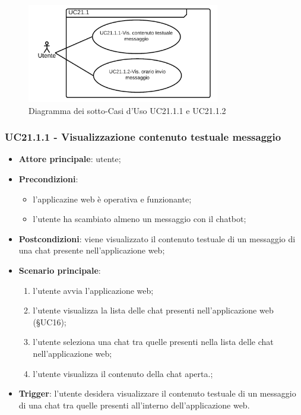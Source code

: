 \documentclass[10pt, a4paper]{article}
\begin{document}
    \begin{figure}[h]
        \centering
        \includegraphics[width=0.75\textwidth, height=0.75\textheight, keepaspectratio]{UC-images/UC21.1.1-UC21.1.2.png}
        \caption{Diagramma dei sotto-Casi d'Uso UC21.1.1 e UC21.1.2}
    \end{figure}

    \subsubsection{UC21.1.1 - Visualizzazione contenuto testuale messaggio}
    \begin{itemize}
        \item \textbf{Attore principale}: utente;
        \item \textbf{Precondizioni}: 
        \begin{itemize}
            \item l'applicazine web è operativa e funzionante;
            \item l'utente ha scambiato almeno un messaggio con il chatbot;
        \end{itemize}
        \item \textbf{Postcondizioni}: viene visualizzato il contenuto testuale di un messaggio di una chat presente nell'applicazione web;
        \item \textbf{Scenario principale}:
            \begin{enumerate}
                \item l'utente avvia l'applicazione web;
                \item l'utente visualizza la lista delle chat presenti nell'applicazione web (\S UC16);
                \item l'utente seleziona una chat tra quelle presenti nella lista delle chat nell'applicazione web;
                \item l'utente visualizza il contenuto della chat aperta.;
            \end{enumerate}
        \item \textbf{Trigger}: l'utente desidera visualizzare il contenuto testuale di un messaggio di una chat tra quelle presenti all'interno dell'applicazione web.
    \end{itemize}
\end{document}
